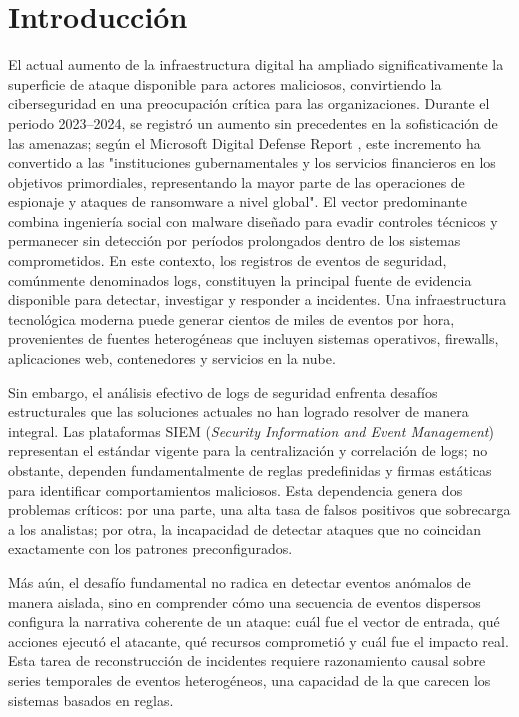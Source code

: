 \chapter{Introducción}

El actual aumento de la infraestructura digital ha ampliado significativamente la superficie de ataque disponible para actores maliciosos, convirtiendo la ciberseguridad en una preocupación crítica para las organizaciones. Durante el periodo 2023–2024, se registró un aumento sin precedentes en la sofisticación de las amenazas; según el Microsoft Digital Defense Report \cite{MS-data}, este incremento ha convertido a las "instituciones gubernamentales y los servicios financieros en los objetivos primordiales, representando la mayor parte de las operaciones de espionaje y ataques de ransomware a nivel global". El vector predominante combina ingeniería social con malware diseñado para evadir controles técnicos y permanecer sin detección por períodos prolongados dentro de los sistemas comprometidos. En este contexto, los registros de eventos de seguridad, comúnmente denominados logs, constituyen la principal fuente de evidencia disponible para detectar, investigar y responder a incidentes. Una infraestructura tecnológica moderna puede generar cientos de miles de eventos por hora, provenientes de fuentes heterogéneas que incluyen sistemas operativos, firewalls, aplicaciones web, contenedores y servicios en la nube.


Sin embargo, el análisis efectivo de logs de seguridad enfrenta desafíos estructurales que las soluciones actuales no han logrado resolver de manera integral. Las plataformas SIEM (\textit{Security Information and Event Management}) representan el estándar vigente para la centralización y correlación de logs; no obstante, dependen fundamentalmente de reglas predefinidas y firmas estáticas para identificar comportamientos maliciosos. Esta dependencia genera dos problemas críticos: por una parte, una alta tasa de falsos positivos que sobrecarga a los analistas; por otra, la incapacidad de detectar ataques que no coincidan exactamente con los patrones preconfigurados.

Más aún, el desafío fundamental no radica en detectar eventos anómalos de manera aislada, sino en comprender cómo una secuencia de eventos dispersos configura la narrativa coherente de un ataque: cuál fue el vector de entrada, qué acciones ejecutó el atacante, qué recursos comprometió y cuál fue el impacto real. Esta tarea de reconstrucción de incidentes requiere razonamiento causal sobre series temporales de eventos heterogéneos, una capacidad de la que carecen los sistemas basados en reglas.

